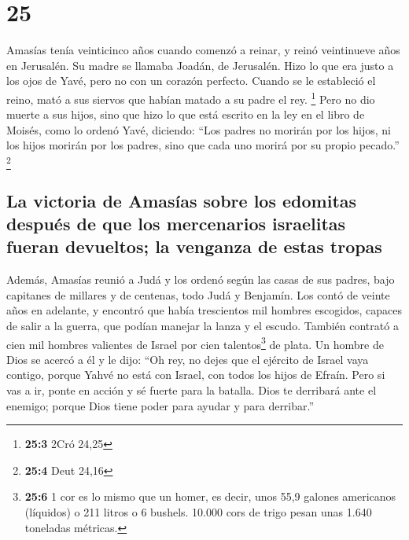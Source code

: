 \hypertarget{section-24}{%
\section{25}\label{section-24}}

 Amasías tenía veinticinco años cuando comenzó a reinar, y
reinó veintinueve años en Jerusalén. Su madre se llamaba Joadán, de
Jerusalén.  Hizo lo que era justo a los ojos de Yavé, pero
no con un corazón perfecto.  Cuando se le estableció el
reino, mató a sus siervos que habían matado a su padre el rey.
\footnote{\textbf{25:3} 2Cró 24,25}  Pero no dio muerte a
sus hijos, sino que hizo lo que está escrito en la ley en el libro de
Moisés, como lo ordenó Yavé, diciendo: ``Los padres no morirán por los
hijos, ni los hijos morirán por los padres, sino que cada uno morirá por
su propio pecado.'' \footnote{\textbf{25:4} Deut 24,16}

\hypertarget{la-victoria-de-amasuxedas-sobre-los-edomitas-despuuxe9s-de-que-los-mercenarios-israelitas-fueran-devueltos-la-venganza-de-estas-tropas}{%
\subsection{La victoria de Amasías sobre los edomitas después de que los
mercenarios israelitas fueran devueltos; la venganza de estas
tropas}\label{la-victoria-de-amasuxedas-sobre-los-edomitas-despuuxe9s-de-que-los-mercenarios-israelitas-fueran-devueltos-la-venganza-de-estas-tropas}}

 Además, Amasías reunió a Judá y los ordenó según las
casas de sus padres, bajo capitanes de millares y de centenas, todo Judá
y Benjamín. Los contó de veinte años en adelante, y encontró que había
trescientos mil hombres escogidos, capaces de salir a la guerra, que
podían manejar la lanza y el escudo.  También contrató a
cien mil hombres valientes de Israel por cien talentos\footnote{\textbf{25:6}
  1 cor es lo mismo que un homer, es decir, unos 55,9 galones americanos
  (líquidos) o 211 litros o 6 bushels. 10.000 cors de trigo pesan unas
  1.640 toneladas métricas.} de plata.  Un hombre de Dios
se acercó a él y le dijo: ``Oh rey, no dejes que el ejército de Israel
vaya contigo, porque Yahvé no está con Israel, con todos los hijos de
Efraín.  Pero si vas a ir, ponte en acción y sé fuerte
para la batalla. Dios te derribará ante el enemigo; porque Dios tiene
poder para ayudar y para derribar.''

